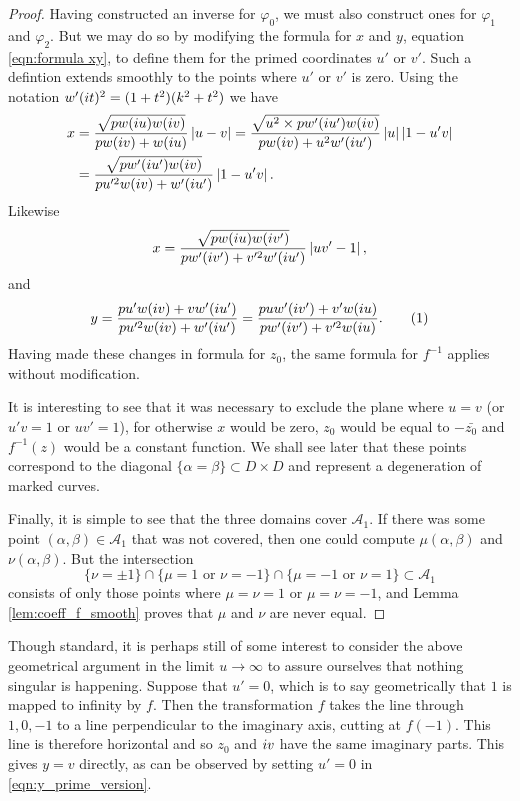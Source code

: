 \begin{lem}
\begin{proof}
Having constructed an inverse for $φ_0$, we must also construct ones for $φ_1$ and $φ_2$. But we may do so by modifying the formula for $x$ and $y$, equation \eqref{eqn:formula xy}, to define them for the primed coordinates $u'$ or $v'$. Such a defintion extends smoothly to the points where $u'$ or $v'$ is zero. Using the notation $w'(i t)^2 = (1+t^2)(k^2 + t^2)$ we have
\begin{align*}
x
&= \frac{\sqrt{pw(i u)w(i v)}}{pw(i v) + w(i u)} \left|u-v\right|
= \frac{\sqrt{u^2 \times pw'(i u')w(i v)}}{pw(i v) + u^2 w'(i u')} \left|u\right|\left|1-u'v\right| \\
&= \frac{\sqrt{pw'(i u')w(i v)}}{pu'^2w(i v) + w'(i u')} \left|1-u'v\right|.
\end{align*}
Likewise
\[
x
= \frac{\sqrt{pw(i u)w(i v')}}{pw'(i v') + v'^2w'(i u')} \left|uv'-1\right|,
\]
and
\[
y
= \frac{pu'w(\iu v) + vw'(\iu u')}{pu'^2w(\iu v) + w'(\iu u')}
= \frac{puw'(\iu v') + v'w(\iu u)}{pw'(\iu v') + v'^2w(\iu u)}. \labelthis{eqn:y_prime_version}
\]
Having made these changes in formula for $z_0$, the same formula for $f^{-1}$ applies without modification.

It is interesting to see that it was necessary to exclude the plane where $u=v$ (or $u'v=1$ or $uv'=1$), for otherwise $x$ would be zero, $z_0$ would be equal to $-\bar{z_0}$ and $f^{-1}(z)$ would be a constant function. We shall see later that these points correspond to the diagonal $\{α=β\} \subset D\times D$ and represent a degeneration of marked curves.

Finally, it is simple to see that the three domains cover $\mathcal{A}_1$. If there was some point $(α,β) \in \mathcal{A}_1$ that was not covered, then one could compute $μ(α,β)$ and $ν(α,β)$. But the intersection
\[
\{ν = \pm 1\}
\cap \{μ = 1 \text{ or } ν = -1 \}
\cap \{μ = -1 \text{ or } ν = 1 \} \subset \mathcal{A}_1
\]
consists of only those points where $μ=ν=1$ or $μ=ν=-1$, and Lemma \ref{lem:coeff_f_smooth} proves that $μ$ and $ν$ are never equal.
\end{proof}
\end{lem}

Though standard, it is perhaps still of some interest to consider the above geometrical argument in the limit $u\to\infty$ to assure ourselves that nothing singular is happening. Suppose that $u' = 0$, which is to say geometrically that $1$ is mapped to infinity by $f$. Then the transformation $f$ takes the line through $1,0,-1$ to a line perpendicular to the imaginary axis, cutting at $f(-1)$. This line is therefore horizontal and so $z_0$ and $i v$ have the same imaginary parts. This gives $y=v$ directly, as can be observed by setting $u'=0$ in \eqref{eqn:y_prime_version}.

